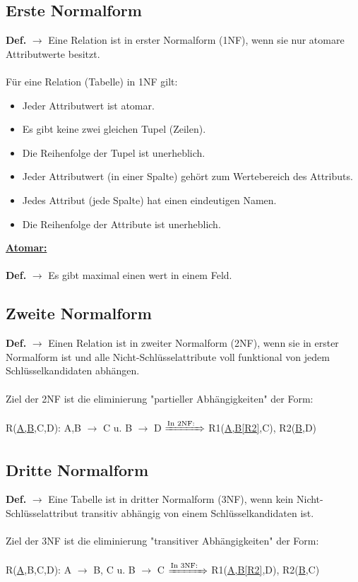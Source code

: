 \documentclass{article}
\newcommand{\Def}[2]{\indexspace\textbf{\underline{#1:}} \\ \\\textbf{Def.} $\rightarrow$ {#2}}
\newcommand{\DApp}[2]{\textbf{#1} $\rightarrow$ {#2}}
\begin{document}
    \subsection{Erste Normalform}
    \noindent\DApp{Def.}{Eine Relation ist in erster Normalform (1NF), wenn sie nur atomare Attributwerte besitzt.}
    \\ \\
    Für eine Relation (Tabelle) in 1NF gilt:
    \begin{itemize}
        \item Jeder Attributwert ist atomar.
        \item Es gibt keine zwei gleichen Tupel (Zeilen).
        \item Die Reihenfolge der Tupel ist unerheblich.
        \item Jeder Attributwert (in einer Spalte) gehört zum Wertebereich des Attributs.
        \item Jedes Attribut (jede Spalte) hat einen eindeutigen Namen.
        \item Die Reihenfolge der Attribute ist unerheblich.
    \end{itemize}

    \Def{Atomar}{Es gibt maximal einen wert in einem Feld.}

    \subsection{Zweite Normalform}
    \noindent\DApp{Def.}{Einen Relation ist in zweiter Normalform (2NF), wenn sie in erster Normalform ist und alle Nicht-Schlüsselattribute voll funktional von jedem Schlüsselkandidaten abhängen.}
    \\ \\
    Ziel der 2NF ist die eliminierung "partieller Abhängigkeiten" der Form: \\ \\
    R(\underline{A,B},C,D): A,B $\rightarrow$ C u. B $\rightarrow$ D $\xRightarrow{\text{In 2NF:} \; \;}$ R1(\underline{A,B[R2]},C), R2(\underline{B},D)
    
    \subsection{Dritte Normalform}
    \noindent\DApp{Def.}{Eine Tabelle ist in dritter Normalform (3NF), wenn kein Nicht-Schlüsselattribut transitiv abhängig von einem Schlüsselkandidaten ist.}
    \\ \\
    Ziel der 3NF ist die eliminierung "transitiver Abhängigkeiten" der Form: \\ \\
    R(\underline{A},B,C,D): A $\rightarrow$ B, C u. B $\rightarrow$ C $\xRightarrow{\text{In 3NF:} \; \;}$ R1(\underline{A,B[R2]},D), R2(\underline{B},C)
\end{document}
